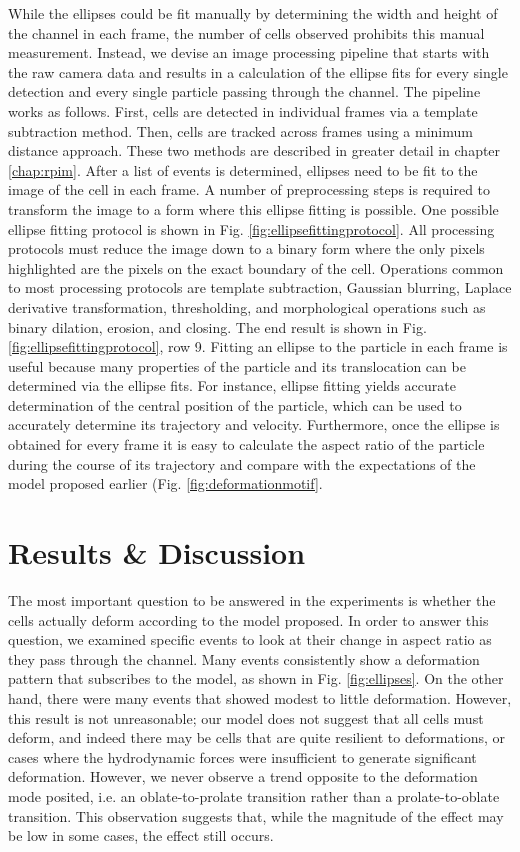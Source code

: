 			While the ellipses could be fit manually by determining the width and height of the channel in each frame, the number of cells observed prohibits this manual measurement. Instead, we devise an image processing pipeline that starts with the raw camera data and results in a calculation of the ellipse fits for every single detection and every single particle passing through the channel. The pipeline works as follows. First, cells are detected in individual frames via a template subtraction method. Then, cells are tracked across frames using a minimum distance approach. These two methods are described in greater detail in chapter \ref{chap:rpim}. After a list of events is determined, ellipses need to be fit to the image of the cell in each frame. A number of preprocessing steps is required to transform the image to a form where this ellipse fitting is possible. One possible ellipse fitting protocol is shown in Fig. \ref{fig:ellipsefittingprotocol}. All processing protocols must reduce the image down to a binary form where the only pixels highlighted are the pixels on the exact boundary of the cell. Operations common to most processing protocols are template subtraction, Gaussian blurring, Laplace derivative transformation, thresholding, and morphological operations such as binary dilation, erosion, and closing. The end result is shown in Fig. \ref{fig:ellipsefittingprotocol}, row 9. Fitting an ellipse to the particle in each frame is useful because many properties of the particle and its translocation can be determined via the ellipse fits. For instance, ellipse fitting yields accurate determination of the central position of the particle, which can be used to accurately determine its trajectory and velocity. Furthermore, once the ellipse is obtained for every frame it is easy to calculate the aspect ratio of the particle during the course of its trajectory and compare with the expectations of the model proposed earlier (Fig. \ref{fig:deformationmotif}.
			
			
	
	\section{Results \& Discussion}
	
		The most important question to be answered in the experiments is whether the cells actually deform according to the model proposed. In order to answer this question, we examined specific events to look at their change in aspect ratio as they pass through the channel. Many events consistently show a deformation pattern that subscribes to the model, as shown in Fig. \ref{fig:ellipses}. On the other hand, there were many events that showed modest to little deformation. However, this result is not unreasonable; our model does not suggest that all cells must deform, and indeed there may be cells that are quite resilient to deformations, or cases where the hydrodynamic forces were insufficient to generate significant deformation. However, we never observe a trend opposite to the deformation mode posited, i.e. an oblate-to-prolate transition rather than a prolate-to-oblate transition. This observation suggests that, while the magnitude of the effect may be low in some cases, the effect still occurs.

		

		
		


